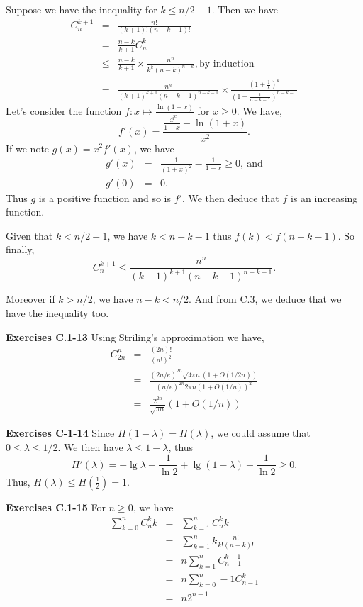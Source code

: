 \documentclass[a4paper,12pt]{article}
\newcommand{\newpar}[1]
{\bigskip \noindent \textbf{Exercises #1} \newline}
\begin{document}
Suppose we have the inequality for $k \le n/2 - 1$.  Then we have
\begin{eqnarray*}
  C_n^{k+1} &=& \frac{n!}{(k+1)!(n-k-1)!} \\
  &=& \frac{n-k}{k+1}C_n^k \\
  &\le& \frac{n-k}{k+1} \times
  \frac{n^n}{k^k(n-k)^{n-k}}, \mbox{by induction} \\
  &=& \frac{n^n}{(k+1)^{k+1}(n-k-1)^{n-k-1}} \times
  \frac{\left(1+\frac{1}{k}\right)^k}
       {\left(1+\frac{1}{n-k-1}\right)^{n-k-1}}
\end{eqnarray*}
Let's consider the function $f: x \mapsto \frac{\ln(1+x)}{x}$ for $x
\ge 0$.  We have,
\[ f'(x) = \frac{\frac{x}{1+x} - \ln(1+x)}{x^2}.\]
If we note $g(x) = x^2 f'(x)$, we have
\begin{eqnarray*}
  g'(x) &=& \frac{1}{(1+x)^2} - \frac{1}{1+x} \ge 0,\ \mbox{and} \\
  g'(0) &=& 0.
\end{eqnarray*}
Thus $g$ is a positive function and so is $f'$.  We then deduce that
$f$ is an increasing function.

Given that $k < n/2 - 1$, we have $k < n-k-1$ thus $f(k) < f(n-k-1)$.
So finally,
\[ C_n^{k+1} \le \frac{n^n}{(k+1)^{k+1}(n-k-1)^{n-k-1}}.\]

Moreover if $k > n/2$, we have $n-k < n/2$.  And from C.3, we deduce
that we have the inequality too.

\newpar{C.1-13}
Using Striling's approximation we have,
\begin{eqnarray*}
  C_{2n}^n &=& \frac{(2n)!}{(n!)^2} \\
  &=& \frac{(2n/e)^{2n}\sqrt{4\pi n}(1+O(1/2n))}
  {(n/e)^{2n} 2\pi n(1+O(1/n))^2} \\  
  &=& \frac{2^{2n}}{\sqrt{\pi n}}(1 + O(1/n))
\end{eqnarray*}

\newpar{C-1-14}
Since $H(1-\lambda) = H(\lambda)$, we could assume that $0 \le \lambda
\le 1/2$.  We then have $\lambda \le 1 - \lambda$, thus
\[  H'(\lambda)  = - \lg \lambda - \frac{1}{\ln 2} +
\lg(1-\lambda) + \frac{1}{\ln 2} \ge 0.\]
Thus, $H(\lambda) \le H(\frac{1}{2}) = 1$.

\newpar{C.1-15}
For $n\ge 0$, we have
\begin{eqnarray*}
  \sum_{k=0}^n C_n^k k &=& \sum_{k=1}^n C_n^k k \\
  &=& \sum_{k=1}^n k \frac{n!}{k!(n-k)!} \\
  &=& n \sum_{k=1}^n C_{n-1}^{k-1} \\
  &=& n \sum_{k=0}^n-1C_{n-1}^k \\
  &=& n 2^{n-1}
\end{eqnarray*}
\end{document}
